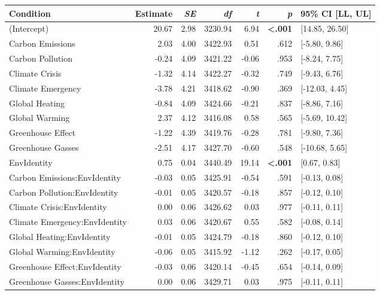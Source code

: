 \begin{table}[ht]
\centering
\begin{tabular}{lrrrrrl}
  \hline
Condition & Estimate & \textit{SE} & \textit{df} & \textit{t} & \textit{p} & 95\% CI [LL, UL] \\ 
  \hline
(Intercept) & 20.67 & 2.98 & 3230.94 & 6.94 & \textbf{\textless  .001} & [14.85, 26.50] \\ 
  Carbon Emissions & 2.03 & 4.00 & 3422.93 & 0.51 & .612 & [-5.80, 9.86] \\ 
  Carbon Pollution & -0.24 & 4.09 & 3421.22 & -0.06 & .953 & [-8.24, 7.75] \\ 
  Climate Crisis & -1.32 & 4.14 & 3422.27 & -0.32 & .749 & [-9.43, 6.76] \\ 
  Climate Emergency & -3.78 & 4.21 & 3418.62 & -0.90 & .369 & [-12.03, 4.45] \\ 
  Global Heating & -0.84 & 4.09 & 3424.66 & -0.21 & .837 & [-8.86, 7.16] \\ 
  Global Warming & 2.37 & 4.12 & 3416.08 & 0.58 & .565 & [-5.69, 10.42] \\ 
  Greenhouse Effect & -1.22 & 4.39 & 3419.76 & -0.28 & .781 & [-9.80, 7.36] \\ 
  Greenhouse Gasses & -2.51 & 4.17 & 3427.70 & -0.60 & .548 & [-10.68, 5.65] \\ 
  EnvIdentity & 0.75 & 0.04 & 3440.49 & 19.14 & \textbf{\textless  .001} & [0.67, 0.83] \\ 
  Carbon Emissions:EnvIdentity & -0.03 & 0.05 & 3425.91 & -0.54 & .591 & [-0.13, 0.08] \\ 
  Carbon Pollution:EnvIdentity & -0.01 & 0.05 & 3420.57 & -0.18 & .857 & [-0.12, 0.10] \\ 
  Climate Crisis:EnvIdentity & 0.00 & 0.06 & 3426.62 & 0.03 & .977 & [-0.11, 0.11] \\ 
  Climate Emergency:EnvIdentity & 0.03 & 0.06 & 3420.67 & 0.55 & .582 & [-0.08, 0.14] \\ 
  Global Heating:EnvIdentity & -0.01 & 0.05 & 3424.79 & -0.18 & .860 & [-0.12, 0.10] \\ 
  Global Warming:EnvIdentity & -0.06 & 0.05 & 3415.92 & -1.12 & .262 & [-0.17, 0.05] \\ 
  Greenhouse Effect:EnvIdentity & -0.03 & 0.06 & 3420.14 & -0.45 & .654 & [-0.14, 0.09] \\ 
  Greenhouse Gasses:EnvIdentity & 0.00 & 0.06 & 3429.71 & 0.03 & .975 & [-0.11, 0.11] \\ 
   \hline
\end{tabular}
\end{table}
